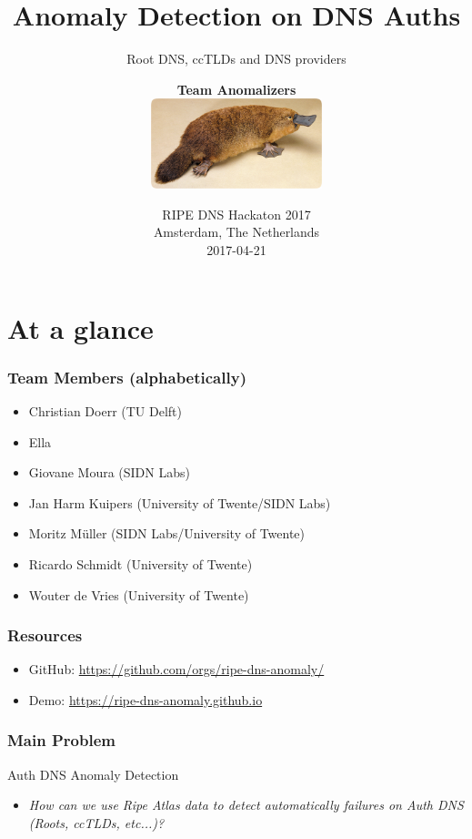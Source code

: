 \documentclass[serif]{beamer}
\title{Anomaly Detection on DNS Auths }
\subtitle{Root DNS, ccTLDs and DNS providers}
\author[\large \textbf{Team \cancel{Schnabeltier}}

]
{\large \textbf{Team \cancel{Schabeltier}Anomalizers}\\
\vspace{0.5cm}
\includegraphics[width=5cm]{fig/Schnabeltier.jpg}
}
\date[IETF98] %
{RIPE DNS Hackaton 2017\\Amsterdam, The Netherlands\\
2017-04-21}
\begin{document}
\frame{\titlepage}

\section{At a glance}

\begin{frame}
	\frametitle{Team Members (alphabetically)}
	
	\begin{itemize}
	\item Christian Doerr (TU Delft)
	\item Ella 
	\item Giovane Moura (SIDN Labs)
	\item Jan Harm Kuipers (University of Twente/SIDN Labs)
	\item Moritz M\"uller (SIDN Labs/University of Twente)
	\item Ricardo Schmidt (University of Twente)
	\item Wouter de Vries (University of Twente)
	\end{itemize}


\end{frame}

\begin{frame}
	\frametitle{Resources}
	
	\begin{itemize}
	  \item GitHub: \url{https://github.com/orgs/ripe-dns-anomaly/}
	  \item Demo: \url{https://ripe-dns-anomaly.github.io}
	\end{itemize}


\end{frame}



\begin{frame}
	\frametitle{Main Problem}
	
	\begin{block}{Auth DNS Anomaly Detection}
	\begin{itemize}
	 \item \textit{How can we use Ripe Atlas data to detect automatically 
failures on Auth DNS (Roots, ccTLDs, etc...)?}
	\end{itemize}

	\end{block}

\end{frame}
\end{document}
